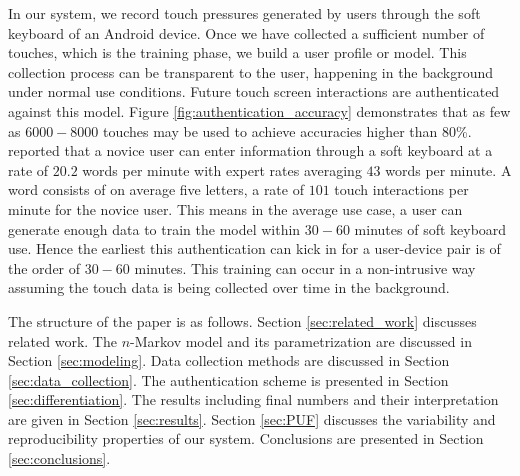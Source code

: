 \documentclass{acm_proc_article-sp}
\begin{document}
In our system, we record touch pressures generated by 
users through the soft keyboard of an Android device. 
Once we have collected a sufficient number of touches, which is the training phase, we build 
a user profile or model.
%
This collection process can be transparent to the user,
happening in the background under normal use conditions. 
Future touch screen interactions are authenticated against this model.
%
Figure \ref{fig:authentication_accuracy} demonstrates that 
as few as $6000-8000$ touches may be used to achieve accuracies higher than $80$\%.
%
\cite{mackenzie1999text} reported that a
novice user can enter information through 
a soft keyboard at a rate of $20.2$ words per minute with
expert rates averaging $43$ words per minute.
%
A word consists of on average five letters, 
a rate of $101$ touch interactions per minute for the novice user.
%
This means in the average use case, a user can generate enough data to train
the model within $30-60$ minutes of soft keyboard use.
%
Hence the earliest this authentication can kick in
for a user-device pair is of the order of $30-60$ minutes.
%
This training can occur in a non-intrusive way
assuming the touch data is being collected over time in the background.

The structure of the paper is as follows. Section \ref{sec:related_work} discusses related work. The $n$-Markov model and its parametrization are discussed in Section \ref{sec:modeling}. 
Data collection methods are discussed in Section \ref{sec:data_collection}. The authentication scheme is presented in Section \ref{sec:differentiation}. The results including final numbers and 
their interpretation are given in Section \ref{sec:results}.
Section \ref{sec:PUF} discusses the variability and reproducibility properties of our system.
Conclusions are presented in Section \ref{sec:conclusions}. 
\end{document}
